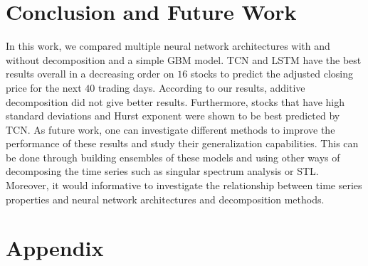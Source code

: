 \documentclass[12pt, A4]{article}
\begin{document}
\section{Conclusion and Future Work}
In this work, we compared multiple neural network architectures with and without decomposition and a simple GBM model. TCN and LSTM have the best results overall in a decreasing order on $16$ stocks to predict the adjusted closing price for the next $40$ trading days. According to our results, additive decomposition did not give better results. Furthermore, stocks that have high standard deviations and Hurst exponent were shown to be best predicted by TCN. As future work, one can investigate different methods to improve the performance of these results and study their generalization capabilities. This can be done through building ensembles of these models and using other ways of decomposing the time series such as singular spectrum analysis or STL.  Moreover, it would informative to investigate the relationship between time series properties and neural network architectures and decomposition methods.




\clearpage

\section{Appendix}
\end{document}
